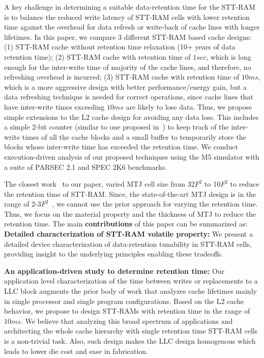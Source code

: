 A key challenge in determining a suitable data-retention time for the STT-RAM is to balance the
reduced write latency of STT-RAM cells with lower retention time against the overhead for data refresh or
write-back of cache lines with longer lifetimes. In this paper, we compare 3 different STT-RAM based
cache designs: (1) STT-RAM cache without retention time relaxation (10+ years of data retention
time); (2) STT-RAM cache with retention time of $1sec$, which is long enough for the inter-write time of
majority of the cache lines, and therefore, no refreshing overhead is incurred; (3) STT-RAM cache with
retention time of $10ms$, which is a more aggressive design with better performance/energy gain, but a
data refreshing technique is needed for correct operations, since cache lines that have inter-write times
exceeding $10ms$ are likely to lose data. Thus, we propose simple extensions to the L2 cache design
for avoiding any data loss. This includes a simple 2-bit counter (similar to one proposed
in~\cite{cache-decay-2001}) to keep track of the inter-write times of all the cache blocks and a small buffer
to temporarily store the blocks whose inter-write time has exceeded the retention time. We conduct
execution-driven analysis of our proposed techniques using the M5 simulator with
a suite of PARSEC 2.1 and SPEC 2K6 benchmarks.

The closest work~\cite{STTRAM:HPCA11} to our paper, varied MTJ cell size from 32$F^2$ to 10$F^2$ to reduce
the retention time of STT-RAM. Since, the state-of-the-art MTJ design is in the range of 2-3$F^2$~\cite{STTRAM:Grandis11}, we cannot use the prior approach for varying the retention time. Thus, we focus on
the material property and the thickness of MTJ to reduce the retention time. The main {\bf contributions} of this paper can be summarized as: \\
\noindent\textbf{Detailed characterization of STT-RAM volatile property:} We present a detailed
device characterization of data-retention tunability in STT-RAM cells, providing insight to the
underlying principles enabling these tradeoffs.

\noindent\textbf{An application-driven study to determine retention time:}
Our application level characterization of the time between writes or replacements to a
LLC block augments the prior body of work that analyzes cache lifetimes mainly
in single processor and single program configurations. Based on the L2 cache behavior,
we propose to design STT-RAMs with retention time in the range of $10ms$.
We believe that analyzing this broad spectrum of applications
and architecting the whole cache hierarchy with single retention time STT-RAM
cells is a non-trivial task. Also, such design
makes the LLC design homogenous which leads to lower die cost and ease in fabrication.


